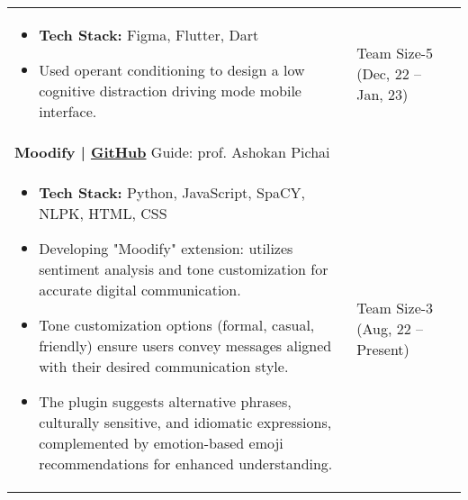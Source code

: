 \documentclass[10pt]{extarticle}
\begin{document}
\begin{contained}
\begin{longtable}{p{}p{}p{}}
    \begin{itemize}
        \item \textbf{Tech Stack:} Figma, Flutter, Dart
        \item Used operant conditioning to design a  low cognitive distraction driving mode mobile interface.
    \end{itemize}
    \vspace{-4mm}
    &Team Size-5
    \newline (Dec, 22 – Jan, 23)\\
    \textbf{Moodify | \href{https://github.com/encryptedcation/TankStars}{GitHub}}\newline
    Guide: prof. Ashokan Pichai\\
    \vspace{-4mm}
    \begin{itemize}
        \item \textbf{Tech Stack:} Python, JavaScript, SpaCY, NLPK, HTML, CSS
        \item Developing "Moodify" extension: utilizes sentiment analysis and tone customization for accurate digital communication.
        \item Tone customization options (formal, casual, friendly) ensure users convey messages aligned with their desired communication style.
        \item The plugin suggests alternative phrases, culturally sensitive, and idiomatic expressions, complemented by emotion-based emoji recommendations for enhanced understanding.
    \end{itemize}
    \vspace{-4mm}
    &Team Size-3
    \newline (Aug, 22 – Present)\\

\end{longtable}
\end{contained}
\end{document}
